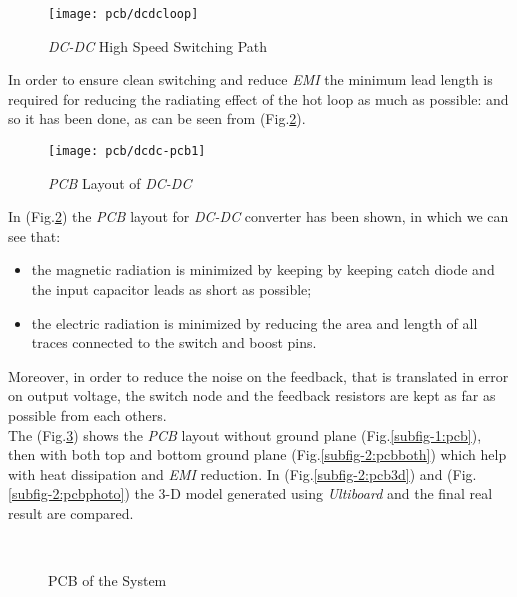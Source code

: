 \begin{figure}[h]
	\centering
	\texttt{[image: pcb/dcdcloop]}
	\caption{\textit{DC-DC} High Speed Switching Path}
	\label{Fig:High}
\end{figure}

In order to ensure clean switching and reduce \textit{EMI} the minimum lead length is required for reducing the radiating effect of the hot loop as much as possible: and so it has been done, as can be seen from (Fig.\ref{Fig:dcdc-pcb}).

\begin{figure}[h]
	\centering
	\texttt{[image: pcb/dcdc-pcb1]}
	\caption{\textit{PCB} Layout of \textit{DC-DC}}
	\label{Fig:dcdc-pcb}
\end{figure}

In (Fig.\ref{Fig:dcdc-pcb}) the \textit{PCB} layout for \textit{DC-DC} converter has been shown, in which we can see that: 
\begin{itemize}
	\item the magnetic radiation is minimized by keeping by keeping catch diode and the input capacitor leads as short as possible;
	\item the electric radiation is minimized by reducing the area and length of all traces connected to the switch and boost pins.
\end{itemize}

Moreover, in order to reduce the noise on the feedback, that is translated in error on output voltage, the switch node and the feedback resistors are kept as far as possible from each others.\\

The (Fig.\ref{fig:PCB}) shows the \textit{PCB} layout without ground plane (Fig.\ref{subfig-1:pcb}), then with both top and bottom ground plane (Fig.\ref{subfig-2:pcbboth}) which help with heat dissipation and \textit{EMI} reduction. In (Fig.\ref{subfig-2:pcb3d}) and (Fig.\ref{subfig-2:pcbphoto}) the 3-D model generated using \textit{Ultiboard} and the final real result are compared.


\begin{figure}[h]
	\\
	\caption{PCB of the System}\label{fig:PCB}
\end{figure}
